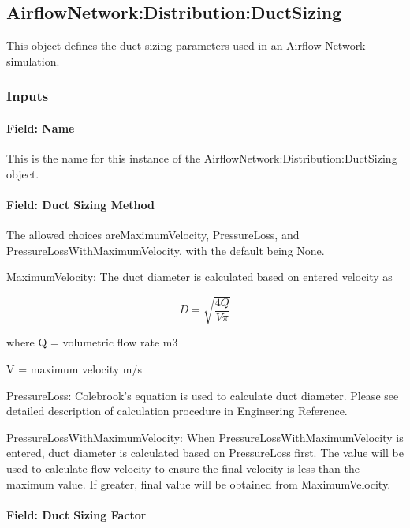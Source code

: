 \subsection{AirflowNetwork:Distribution:DuctSizing}\label{airflownetworkdistributionductsizing}

This object defines the duct sizing parameters used in an Airflow Network simulation.

\subsubsection{Inputs}\label{inputs-AFN-DuctSizing}

\paragraph{Field: Name}\label{field-name-ductsizing}

This is the name for this instance of the AirflowNetwork:Distribution:DuctSizing object.

\paragraph{Field: Duct Sizing Method}\label{duct-sizing-method}

 The allowed choices areMaximumVelocity, PressureLoss, and PressureLossWithMaximumVelocity, with the default being None.

MaximumVelocity: The duct diameter is calculated based on entered velocity as

\begin{equation}
D = \sqrt{\frac{4Q}{V \pi } }
\end{equation}

where Q = volumetric flow rate {m3}

      V = maximum velocity {m/s}

PressureLoss: Colebrook's equation is used to calculate duct diameter. Please see detailed description of calculation procedure in Engineering Reference.

PressureLossWithMaximumVelocity: When PressureLossWithMaximumVelocity is entered, duct diameter is calculated based on PressureLoss first. The value will be used to calculate flow velocity to ensure the final velocity is less than the maximum value. If greater, final value will be obtained from MaximumVelocity.

\paragraph{Field: Duct Sizing Factor}\label{duct-sizing-factor}

